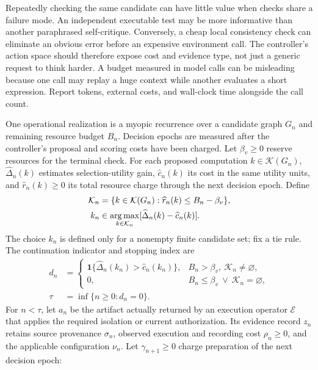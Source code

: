 Repeatedly checking the same candidate can have little value when checks share a failure mode. An independent executable test may be more informative than another paraphrased self-critique. Conversely, a cheap local consistency check can eliminate an obvious error before an expensive environment call. The controller's action space should therefore expose cost and evidence type, not just a generic request to think harder. A budget measured in model calls can be misleading because one call may replay a huge context while another evaluates a short expression. Report tokens, external costs, and wall-clock time alongside the call count.

One operational realization is a myopic recurrence over a candidate graph $G_n$ and remaining resource budget $B_n$. Decision epochs are measured after the controller's proposal and scoring costs have been charged. Let $\beta_v\geq0$ reserve resources for the terminal check. For each proposed computation $k\in\mathcal K(G_n)$, $\widehat\Delta_n(k)$ estimates selection-utility gain, $\widehat c_n(k)$ its cost in the same utility units, and $\widehat r_n(k)\geq0$ its total resource charge through the next decision epoch. Define
\begin{equation}
\begin{aligned}
 \mathcal K_n
 &=\{k\in\mathcal K(G_n):\widehat r_n(k)\leq B_n-\beta_v\},\\
 k_n&\in\operatorname*{arg\,max}_{k\in\mathcal K_n}
       [\widehat\Delta_n(k)-\widehat c_n(k)].
\end{aligned}
\label{eq:C09:computation-selection}
\end{equation}
The choice $k_n$ is defined only for a nonempty finite candidate set; fix a tie rule. The continuation indicator and stopping index are
\begin{equation}
\begin{aligned}
 d_n&=
 \begin{cases}
 \mathbf1\{\widehat\Delta_n(k_n)>\widehat c_n(k_n)\},
   &B_n>\beta_v,\ \mathcal K_n\ne\varnothing,\\
 0,&B_n\leq\beta_v\ \vee\ \mathcal K_n=\varnothing,
 \end{cases}\\
 \tau&=\inf\{n\geq0:d_n=0\}.
\end{aligned}
\label{eq:C09:computation-stop}
\end{equation}
For $n<\tau$, let $a_n$ be the artifact actually returned by an execution operator $\mathcal E$ that applies the required isolation or current authorization. Its evidence record $z_n$ retains source provenance $\sigma_n$, observed execution and recording cost $\rho_n\geq0$, and the applicable configuration $\nu_n$. Let $\gamma_{n+1}\geq0$ charge preparation of the next decision epoch:
